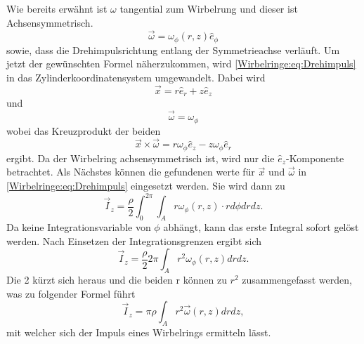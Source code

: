 Wie bereits erwähnt ist $\omega$ tangential zum Wirbelrung und dieser ist Achsensymmetrisch.
\begin{equation*}
    \vec{\omega}
    =
    \omega_\phi(r,z)\hat{e}_\phi
\end{equation*}
sowie, dass die Drehimpulsrichtung entlang der Symmetrieachse verläuft.
Um jetzt der gewünschten Formel näherzukommen, wird \eqref{Wirbelringe:eq:Drehimpuls} in das Zylinderkoordinatensystem umgewandelt.
Dabei wird
\begin{equation*}
    \vec{x}
    =
    r\hat{e}_r + z\hat{e}_z
\end{equation*}
und
\begin{equation*}
    \vec{\omega}
    =
    \omega_\phi
\end{equation*}
wobei das Kreuzprodukt der beiden 
\begin{equation*}
    \vec{x}\times\vec{\omega}
    =
    r\omega_\phi\hat{e}_z - z\omega_\phi\hat{e}_r
\end{equation*}
ergibt. Da der Wirbelring achsensymmetrisch ist, wird nur die $\hat{e}_z$-Komponente betrachtet.
Als Nächstes können die gefundenen werte für $\vec{x}$ und $\vec{\omega}$ in \eqref{Wirbelringe:eq:Drehimpuls} eingesetzt werden.
Sie wird dann zu
\begin{equation*}
    \vec{I}_z
    =
    \frac{\rho}{2}\int_{0}^{2\pi}\int_{A}r\omega_\phi(r,z)\cdot rd\phi drdz.
\end{equation*}
Da keine Integrationsvariable von $\phi$ abhängt, kann das erste Integral sofort gelöst werden. Nach Einsetzen der Integrationsgrenzen ergibt sich
\begin{equation*}
    \vec{I}_z
    =
    \frac{\rho}{2}2\pi\int_{A}r^2\omega_\phi(r,z)drdz.
\end{equation*}
Die 2 kürzt sich heraus und die beiden r können zu $r^2$ zusammengefasst werden, was zu folgender Formel führt
\begin{equation}
    \vec{I}_z
    =
    \pi\rho\int_{A}r^2\vec{\omega}(r,z)drdz
    \label{Wirbelringe:eq:achssymImp},
\end{equation}
mit welcher sich der Impuls eines Wirbelrings ermitteln lässt.

